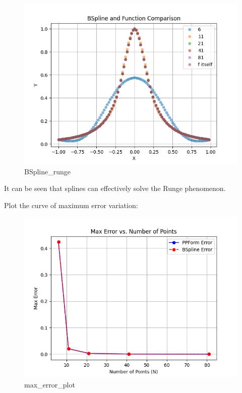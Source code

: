\documentclass[a4paper]{article}
\begin{document}
    \begin{figure}[H] 
        \centering
        \includegraphics{../figure/BSpline_runge.png} 
        \caption{BSpline\_runge} 
    \end{figure}
    It can be seen that splines can effectively solve the Runge phenomenon.
    
    Plot the curve of maximum error variation:
    \begin{figure}[H] 
        \centering
        \includegraphics{../figure/max_error_plot.png} 
        \caption{max\_error\_plot} 
    \end{figure}
    
\end{document}
